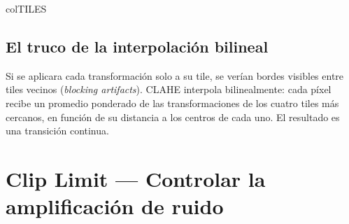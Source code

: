 \documentclass[11pt,a4paper]{article}
\begin{document}
\begin{keybox}{colTILES}
\subsection*{El truco de la interpolación bilineal}

Si se aplicara cada transformación solo a su tile, se verían bordes visibles
entre tiles vecinos (\emph{blocking artifacts}). CLAHE interpola
bilinealmente: cada píxel recibe un promedio ponderado de las transformaciones
de los cuatro tiles más cercanos, en función de su distancia a los centros de
cada uno. El resultado es una transición continua.

\end{keybox}

\section{\textcolor{colCLIP}{Clip Limit} — Controlar la amplificación de ruido}
\end{document}
